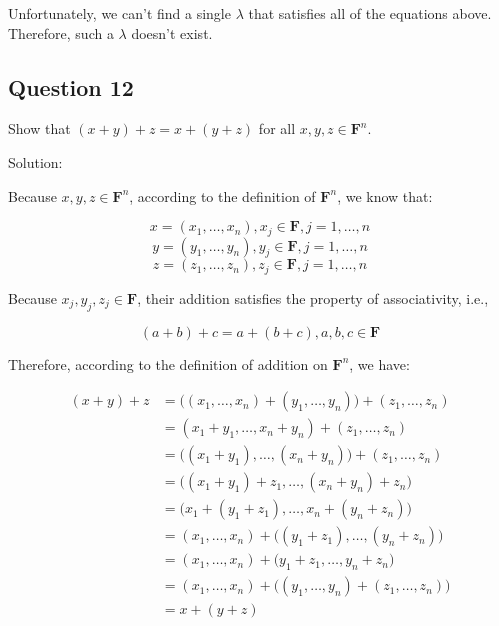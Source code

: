 \documentclass[12pt, letterpaper, oneside]{book}
\begin{document}
Unfortunately, we can't find a single $\lambda$ that satisfies all of the
equations above. Therefore, such a $\lambda$ doesn't exist.

\subsection{Question 12}

Show that $(x + y) + z = x + (y + z)$ for all $x, y, z \in \mathbf{F}^n$.

Solution:

Because $x, y, z \in \mathbf{F}^n$, according to the definition of
$\mathbf{F}^n$, we know that:

\[ x = (x_1, \ldots, x_n), x_j \in \mathbf{F}, j = 1, \ldots, n \]
\[ y = (y_1, \ldots, y_n), y_j \in \mathbf{F}, j = 1, \ldots, n \]
\[ z = (z_1, \ldots, z_n), z_j \in \mathbf{F}, j = 1, \ldots, n \]

Because $x_j, y_j, z_j \in \mathbf{F}$, their addition satisfies the property
of associativity, i.e.,

\[ (a + b) + c = a + (b + c), a, b, c \in \mathbf{F} \]

Therefore, according to the definition of addition on $\mathbf{F}^n$, we have:

\begin{equation*}
  \begin{split}
    (x + y) + z
    & = \bigl((x_1, \ldots, x_n) + (y_1, \ldots, y_n)\bigr) +
    (z_1, \ldots, z_n) \\
    & = (x_1 + y_1, \ldots, x_n + y_n) + (z_1, \ldots, z_n) \\
    & = \bigl((x_1 + y_1), \ldots, (x_n + y_n)\bigr) + (z_1, \ldots, z_n) \\
    & = \bigl((x_1 + y_1) + z_1, \ldots, (x_n + y_n) + z_n\bigr) \\
    & = \bigl(x_1 + (y_1 + z_1), \ldots, x_n + (y_n + z_n)\bigr) \\
    & = (x_1, \ldots, x_n) + \bigl((y_1 + z_1), \ldots, (y_n + z_n)\bigr) \\
    & = (x_1, \ldots, x_n) + \bigl(y_1 + z_1, \ldots, y_n + z_n\bigr) \\
    & = (x_1, \ldots, x_n) + \bigl((y_1, \ldots, y_n) +
    (z_1, \ldots, z_n)\bigr) \\
    & = x + (y + z)
  \end{split}
\end{equation*}

\end{document}
